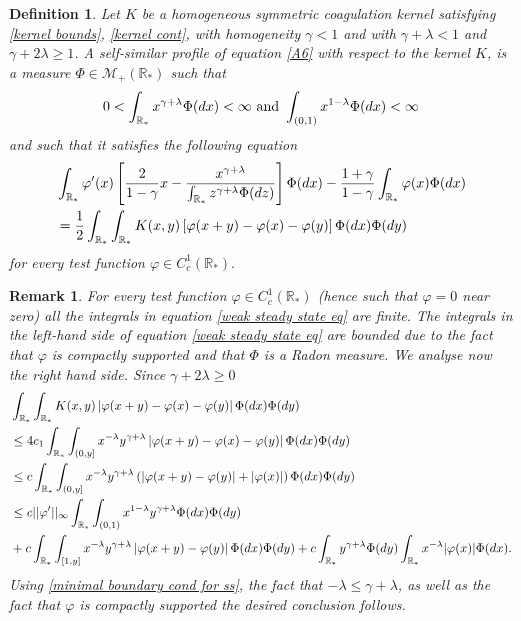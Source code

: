 \documentclass[11pt]{article}
\numberwithin{equation}{section}
\theoremstyle{plain}
\newtheorem{definition}[theorem]{Definition}
\newtheorem{remark}[theorem]{Remark}
\newcommand{\der}{\textup{d}}
\begin{document}
\begin{definition} \label{def:self-similar profile}
Let $K$ be a homogeneous symmetric coagulation kernel satisfying
\eqref{kernel bounds}, \eqref{kernel cont},  with homogeneity $\gamma < 1 $ and with $\gamma + \lambda < 1$ and $\gamma + 2 \lambda \geq 1 $. A self-similar profile of equation \eqref{A6} with respect to the kernel $K$, is a measure $\Phi \in \mathcal M_+(\mathbb R_*) $ such that
\begin{equation}\label{minimal boundary cond for ss} 
0 < \int_{\mathbb R_*}x^{\gamma +\lambda}\Phi(\der x) < \infty \text{ and } \int_{(0,1)}x^{1-\lambda}\Phi(\der x) < \infty 
    \end{equation}
    and such that it satisfies the following equation 
\begin{align}\label{weak steady state eq}
&  \int_{\mathbb R_*}  \varphi'(x) \left[ \frac{2}{1-\gamma}x - \frac{x^{\gamma + \lambda}}{\int_{\mathbb R_*}z^{\gamma +\lambda}\Phi(\der z)}  \right] \Phi(\der x) 
 - \frac{1+\gamma}{1-\gamma} \int_{\mathbb R_*}  \varphi(x) \Phi(\der x)\\
& =\frac{1}{2}\int_{\mathbb R_*} \int_{\mathbb R_*} K(x,y) \left[ \varphi(x+y)- \varphi(x) - \varphi(y) \right] \Phi(\der x) \Phi(\der y) \nonumber 
\end{align} 
for every test function $\varphi \in C^1_c(\mathbb R_*).$
\end{definition} 
\begin{remark}
For every test function $\varphi \in C^1_c(\mathbb R_*)$ (hence such that $\varphi=0$ near zero) all the integrals in equation \eqref{weak steady state eq} are finite. The integrals in the left-hand side of equation \eqref{weak steady state eq} are bounded due to the fact that $\varphi$ is compactly supported and that $\Phi$ is a Radon measure. 
We analyse now the right hand side. 
Since $\gamma + 2 \lambda \geq 0 $
\begin{align*} 
&\int_{\mathbb R_*} \int_{\mathbb R_*} K(x,y) \left| \varphi(x+y)- \varphi(x) - \varphi(y) \right| \Phi(\der x) \Phi(\der  y) \\
 &\leq 4 c_1  \int_{\mathbb R_*} \int_{(0, y]} x^{- \lambda }y^{\gamma + \lambda} \left| \varphi(x+y)- \varphi(x) - \varphi(y) \right| \Phi(\der x) \Phi(\der y) \\ 
 &\leq c  \int_{\mathbb R_*} \int_{(0, y]} x^{- \lambda }y^{\gamma + \lambda} \left(\left| \varphi(x+y) - \varphi(y) \right| + | \varphi(x)| \right) \Phi(\der x) \Phi(\der y)  \\
  &\leq c ||\varphi'||_{\infty}\int_{\mathbb R_*} \int_{(0, 1)} x^{1 - \lambda }y^{\gamma+ \lambda}  \Phi(\der x) \Phi(\der y ) \\
  &+ c  \int_{\mathbb R_*} \int_{[1, y]} x^{ - \lambda }y^{\gamma + \lambda} \left| \varphi(x+y) - \varphi(y) \right| \Phi(\der x) \Phi(\der y ) 
  + c  \int_{\mathbb R_*} y^{\gamma + \lambda}  \Phi(\der y) \int_{\mathbb R_*} x^{- \lambda } |\varphi(x)| \Phi(\der x).
\end{align*}
Using \eqref{minimal boundary cond for ss}, the fact that $- \lambda \leq \gamma + \lambda $, as well as the fact that $\varphi$ is compactly supported the desired conclusion follows. 
\end{remark} 
\end{document}
